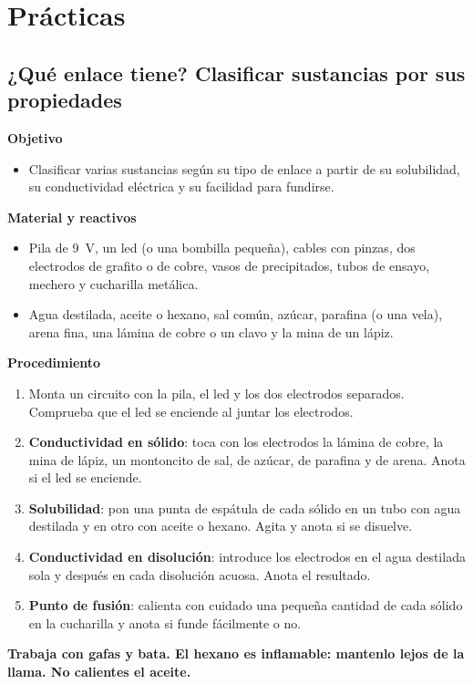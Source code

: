 \section{Prácticas}\label{sec:ud4-practicas}

\subsection{¿Qué enlace tiene? Clasificar sustancias por sus propiedades}

\noindent\begin{minipage}[t]{0.48\textwidth}
    \textbf{Objetivo}
    \begin{itemize}
        \item Clasificar varias sustancias según su tipo de enlace a partir de su solubilidad, su conductividad eléctrica y su
        facilidad para fundirse.
    \end{itemize}
\end{minipage}\hfill
\begin{minipage}[t]{0.48\textwidth}
    \textbf{Material y reactivos}
    \begin{itemize}
        \item Pila de \qty{9}{\volt}, un led (o una bombilla pequeña), cables con pinzas, dos electrodos de grafito o de cobre,
        vasos de precipitados, tubos de ensayo, mechero y cucharilla metálica.
        \item Agua destilada, aceite o hexano, sal común, azúcar, parafina (o una vela), arena fina, una lámina de cobre o un
        clavo y la mina de un lápiz.
    \end{itemize}
\end{minipage}

\textbf{Procedimiento}
\begin{enumerate}[label=\numberballgreen]
    \item Monta un circuito con la pila, el led y los dos electrodos separados. Comprueba que el led se enciende al juntar los
    electrodos.
    \item \textbf{Conductividad en sólido}: toca con los electrodos la lámina de cobre, la mina de lápiz, un montoncito de sal,
    de azúcar, de parafina y de arena. Anota si el led se enciende.
    \item \textbf{Solubilidad}: pon una punta de espátula de cada sólido en un tubo con agua destilada y en otro con aceite o
    hexano. Agita y anota si se disuelve.
    \item \textbf{Conductividad en disolución}: introduce los electrodos en el agua destilada sola y después en cada disolución
    acuosa. Anota el resultado.
    \item \textbf{Punto de fusión}: calienta con cuidado una pequeña cantidad de cada sólido en la cucharilla y anota si funde
    fácilmente o no.
\end{enumerate}
\textbf{Trabaja con gafas y bata. El hexano es inflamable: mantenlo lejos de la llama. No calientes el aceite.}

